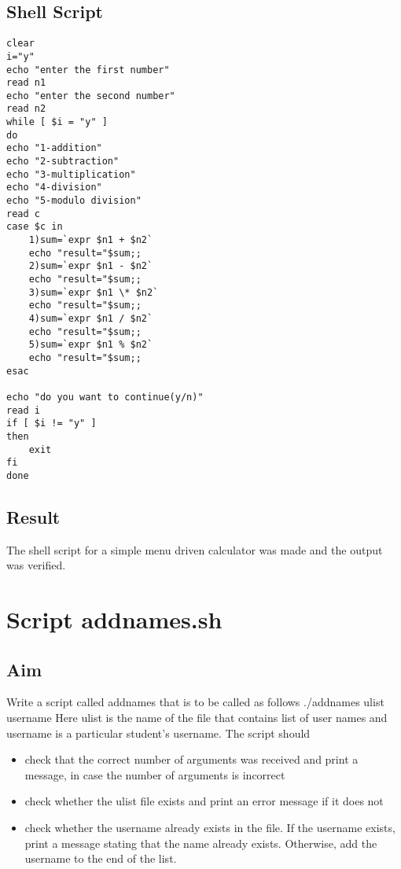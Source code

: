 \documentclass{article}
\begin{document}
\subsection{Shell Script}

\begin{verbatim}
clear 
i="y"
echo "enter the first number"
read n1
echo "enter the second number"
read n2
while [ $i = "y" ]
do
echo "1-addition"
echo "2-subtraction"
echo "3-multiplication"
echo "4-division"
echo "5-modulo division"
read c
case $c in 
	1)sum=`expr $n1 + $n2`
	echo "result="$sum;;
	2)sum=`expr $n1 - $n2`
    echo "result="$sum;;
	3)sum=`expr $n1 \* $n2`
    echo "result="$sum;;
	4)sum=`expr $n1 / $n2`
    echo "result="$sum;;
    5)sum=`expr $n1 % $n2`
    echo "result="$sum;;
esac

echo "do you want to continue(y/n)"
read i
if [ $i != "y" ]
then 
	exit
fi
done
\end{verbatim}

\subsection{Result}
The shell script for a simple menu driven calculator was made and the output was verified.
\newpage

\section{Script addnames.sh}
\subsection{Aim}
Write a script called addnames that is to be called as follows ./addnames ulist username
Here ulist is the name of the file that contains list of user names and username is a particular student's username. The script should
\begin{itemize}
\item check that the correct number of arguments was received and print a message, in case the number of arguments is incorrect
\item check whether the ulist file exists and print an error message if it does not
\item check whether the username already exists in the file. If the username exists, print a message stating that the name already exists. Otherwise, add the username to the end of
the list.
\end{itemize}
\end{document}
